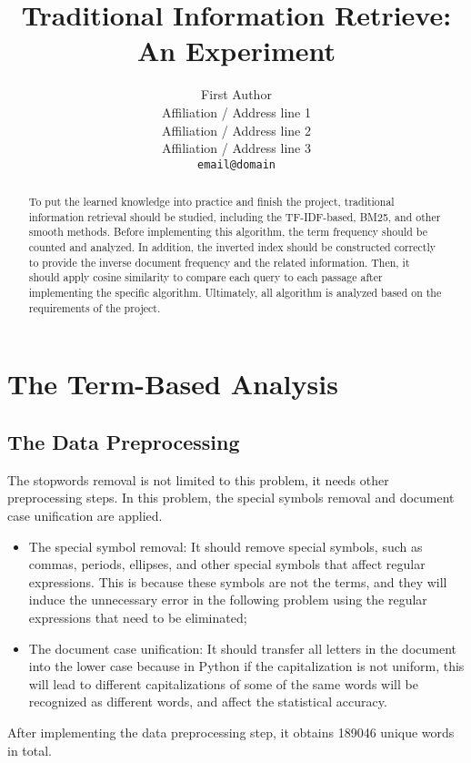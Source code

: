 \documentclass[11pt]{article}
\title{Traditional Information Retrieve: An Experiment}
\author{First Author \\
  Affiliation / Address line 1 \\
  Affiliation / Address line 2 \\
  Affiliation / Address line 3 \\
  \texttt{email@domain}}
\begin{document}
\maketitle
\begin{abstract}
To put the learned knowledge into practice and finish the project, traditional information retrieval should be studied, including the TF-IDF-based, BM25, and other smooth methods. Before implementing this algorithm, the term frequency should be counted and analyzed. In addition, the inverted index should be constructed correctly to provide the inverse document frequency and the related information. Then, it should apply cosine similarity to compare each query to each passage after implementing the specific algorithm. Ultimately, all algorithm is analyzed based on the requirements of the project.
\end{abstract}

\section{The Term-Based Analysis}

\subsection{The Data Preprocessing}

The stopwords removal is not limited to this problem, it needs other preprocessing steps. In this problem, the special symbols removal and document case unification are applied.

\begin{itemize}
	\item The special symbol removal: It should remove special symbols, such as commas, periods, ellipses, and other special symbols that affect regular expressions. This is because these symbols are not the terms, and they will induce the unnecessary error in the following problem using the regular expressions that need to be eliminated;
	\item The document case unification: It should transfer all letters in the document into the lower case because in Python if the capitalization is not uniform, this will lead to different capitalizations of some of the same words will be recognized as different words, and affect the statistical accuracy.
\end{itemize}

After implementing the data preprocessing step, it obtains 189046 unique words in total.
\end{document}
